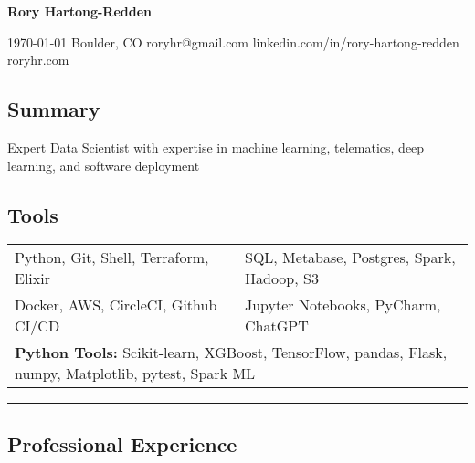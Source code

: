 \documentclass[10pt,letterpaper]{article}
\newenvironment{indentsection}[1]
{\begin{list}{}%
	{\setlength{\leftmargin}{#1}}
	\item[]%
}
{\end{list}}
\begin{document}
{\raggedright \LARGE \bf Rory Hartong-Redden}

{\raggedleft 
\today \/ \textbar
\/ Boulder, CO \textbar
\/ roryhr@gmail.com \textbar
\/ linkedin.com/in/rory-hartong-redden \textbar
\/ roryhr.com
\\
}

\subsection*{Summary}
\begin{centering}  
Expert Data Scientist with expertise in machine learning, telematics, deep learning, and software deployment
\end{centering}

\subsection*{Tools}
\begin{indentsection}{\parindent}
\begin{tabular}{p{0.5\linewidth}   p{0.5\linewidth}} 
	Python, Git, Shell, Terraform, Elixir
	& SQL, Metabase, Postgres, Spark, Hadoop, S3 \\

	Docker, AWS, CircleCI, Github CI/CD
	& Jupyter Notebooks, PyCharm, ChatGPT\\ 
	
	\multicolumn{2}{l}{
		\textbf{Python Tools:} Scikit-learn, XGBoost, TensorFlow, pandas, Flask, numpy, Matplotlib, pytest, Spark ML
		}
\end{tabular}
\end{indentsection}

\hrule
\subsection*{Professional Experience}
\end{document}
